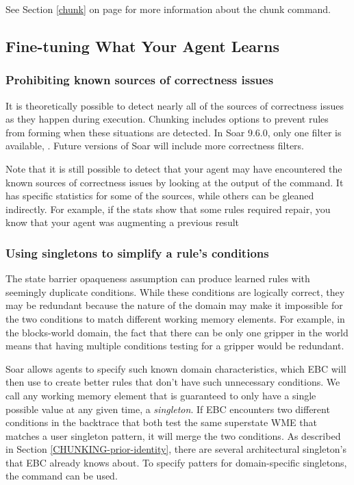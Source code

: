 See Section \ref{chunk} on page \pageref{chunk} for more information about the chunk command.


\subsection{Fine-tuning What Your Agent Learns}
\label{CHUNKING-usage-tuning}

\subsubsection{Prohibiting known sources of correctness issues}
\label{CHUNKING-usage-tuning-correctness}

It is theoretically possible to detect nearly all of the sources of correctness issues as they happen during execution.  Chunking includes options to prevent rules from forming when these situations are detected.  In Soar 9.6.0, only one filter is available, .  Future versions of Soar will include more correctness filters.

Note that it is still possible to detect that your agent may have encountered the known sources of correctness issues by looking at the output of the  command.  It has specific statistics for some of the sources, while others can be gleaned indirectly.  For example, if the stats show that some rules required repair, you know that your agent was augmenting a previous result

\subsubsection{Using singletons to simplify a rule's conditions}
\label{CHUNKING-usage-tuning-conditions}

The state barrier opaqueness assumption can produce learned rules with seemingly duplicate conditions.  While these conditions are logically correct, they may be redundant because the nature of the domain may make it impossible for the two conditions to match different working memory elements.  For example, in the blocks-world domain, the fact that there can be only one gripper in the world means that having multiple conditions testing for a gripper would be redundant.  

Soar allows agents to specify such known domain characteristics, which EBC will then use to create better rules that don't have such unnecessary conditions.  We call any working memory element that is guaranteed to only have a single possible value at any given time, a \textit{singleton}.  If EBC encounters two different conditions in the backtrace that both test the same superstate WME that matches a user singleton pattern, it will merge the two conditions. As described in Section \ref{CHUNKING-prior-identity}, there are several architectural singleton's that EBC already knows about.  To specify patters for domain-specific singletons, the  command can be used. 

